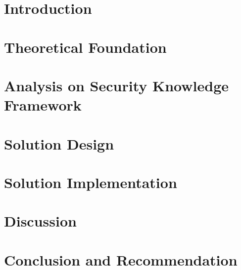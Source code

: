 \documentclass[12pt, a4paper]{report}
\begin{document}








\tableofcontents
\listoffigures
\listoftables

\chapter{Introduction}


\chapter{Theoretical Foundation}


\chapter{Analysis on Security Knowledge Framework}


\chapter{Solution Design}


\chapter{Solution Implementation}


\chapter{Discussion}


\chapter{Conclusion and Recommendation}


\printbibliography[title={\MakeUppercase{\large References}}]
\end{document}
